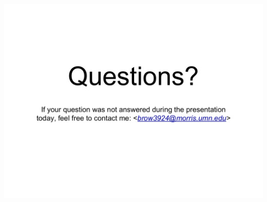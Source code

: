 \documentclass{beamer}
\begin{document}
\begin{frame}
	\includegraphics[width=1\textwidth]{Illustrations/questions.PDF}
\end{frame}
\end{document}
